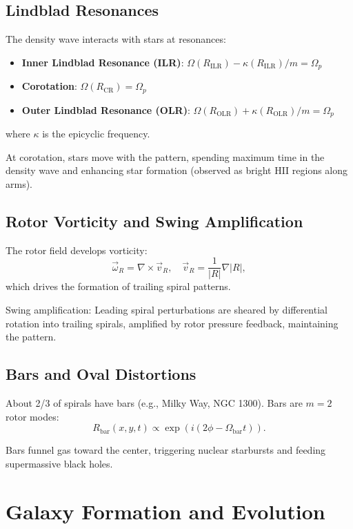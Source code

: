 \documentclass[12pt,a4paper]{article}
\theoremstyle{definition}
\theoremstyle{remark}
\begin{document}
\subsection{Lindblad Resonances}

The density wave interacts with stars at resonances:
\begin{itemize}
\item \textbf{Inner Lindblad Resonance (ILR)}: $\Omega(R_{\text{ILR}}) - \kappa(R_{\text{ILR}})/m = \Omega_p$
\item \textbf{Corotation}: $\Omega(R_{\text{CR}}) = \Omega_p$
\item \textbf{Outer Lindblad Resonance (OLR)}: $\Omega(R_{\text{OLR}}) + \kappa(R_{\text{OLR}})/m = \Omega_p$
\end{itemize}
where $\kappa$ is the epicyclic frequency.

At corotation, stars move with the pattern, spending maximum time in the density wave and enhancing star formation (observed as bright HII regions along arms).

\subsection{Rotor Vorticity and Swing Amplification}

The rotor field develops vorticity:
\begin{equation}
\vec{\omega}_R = \nabla \times \vec{v}_R, \quad \vec{v}_R = \frac{1}{|R|} \nabla |R|,
\end{equation}
which drives the formation of trailing spiral patterns.

Swing amplification: Leading spiral perturbations are sheared by differential rotation into trailing spirals, amplified by rotor pressure feedback, maintaining the pattern.

\subsection{Bars and Oval Distortions}

About 2/3 of spirals have bars (e.g., Milky Way, NGC 1300). Bars are $m=2$ rotor modes:
\begin{equation}
R_{\text{bar}}(x, y, t) \propto \exp\left(i(2\phi - \Omega_{\text{bar}} t)\right).
\end{equation}

Bars funnel gas toward the center, triggering nuclear starbursts and feeding supermassive black holes.

\section{Galaxy Formation and Evolution}
\end{document}
